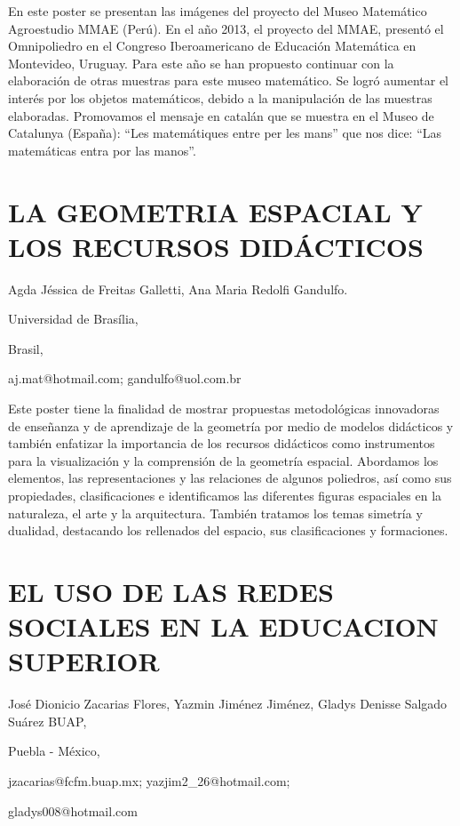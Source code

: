 En este poster se presentan las imágenes del proyecto del Museo Matemático
Agroestudio MMAE (Perú). En el año 2013, el proyecto del MMAE, presentó
el Omnipoliedro en el Congreso Iberoamericano de Educación Matemática
en Montevideo, Uruguay. Para este año se han propuesto continuar con
la elaboración de otras muestras para este museo matemático. Se logró
aumentar el interés por los objetos matemáticos, debido a la manipulación
de las muestras elaboradas. Promovamos el mensaje en catalán que se
muestra en el Museo de Catalunya (España): “Les matemátiques entre
per les mans” que nos dice: “Las matemáticas entra por las manos”. 


\section{LA GEOMETRIA ESPACIAL Y LOS RECURSOS DIDÁCTICOS }

\begin{datos}

Agda Jéssica de Freitas Galletti, Ana Maria Redolfi Gandulfo.

Universidad de Brasília,

Brasil,

aj.mat@hotmail.com; gandulfo@uol.com.br 

\end{datos}

Este poster tiene la finalidad de mostrar propuestas metodológicas
innovadoras de enseñanza y de aprendizaje de la geometría por medio
de modelos didácticos y también enfatizar la importancia de los recursos
didácticos como instrumentos para la visualización y la comprensión
de la geometría espacial. Abordamos los elementos, las representaciones
y las relaciones de algunos poliedros, así como sus propiedades, clasificaciones
e identificamos las diferentes figuras espaciales en la naturaleza,
el arte y la arquitectura. También tratamos los temas simetría y dualidad,
destacando los rellenados del espacio, sus clasificaciones y formaciones. 


\section{EL USO DE LAS REDES SOCIALES EN LA EDUCACION SUPERIOR }

\begin{datos}

José Dionicio Zacarias Flores, Yazmin Jiménez Jiménez, Gladys Denisse
Salgado Suárez BUAP,

Puebla - México,

jzacarias@fcfm.buap.mx; yazjim2\_26@hotmail.com;

gladys008@hotmail.com

\end{datos}

